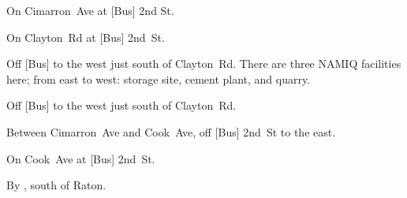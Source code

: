 
\begin{LocationList}

On Cimarron~Ave at [Bus] 2nd St.

On  Clayton~Rd at [Bus] 2nd~St.

Off [Bus] to the west just south of  Clayton~Rd.
There are three NAMIQ facilities here; from east to west: storage site, cement plant, and quarry.

Off [Bus] to the west just south of  Clayton~Rd.

Between Cimarron~Ave and Cook~Ave, off [Bus] 2nd~St to the east.

\Location{\TruckService \Service}
On Cook~Ave at [Bus] 2nd~St.

\Location{\TruckStop \Gas \Rest \Weigh}
By  , south of Raton.

\end{LocationList}
